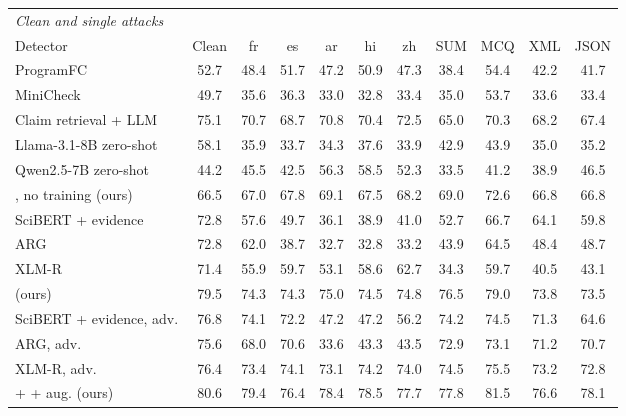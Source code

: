 \begin{table}[t]\centering\small\setlength{\tabcolsep}{4.5pt}
\begin{adjustbox}{max width=\textwidth}\begin{tabular}{lcccccccccc}
\toprule
\multicolumn{11}{l}{\emph{Clean and single attacks}} \\
Detector & Clean & fr & es & ar & hi & zh & SUM & MCQ & XML & JSON \\
\midrule
ProgramFC \citep{pan2023programfc} & 52.7 & 48.4 & 51.7 & 47.2 & 50.9 & 47.3 & 38.4 & 54.4 & 42.2 & 41.7 \\
MiniCheck \citep{tang2024minicheck} & 49.7 & 35.6 & 36.3 & 33.0 & 32.8 & 33.4 & 35.0 & 53.7 & 33.6 & 33.4 \\
Claim retrieval + LLM \citep{pikuliak2023multiclaim} & 75.1 & 70.7 & 68.7 & 70.8 & 70.4 & 72.5 & 65.0 & 70.3 & 68.2 & 67.4 \\
Llama-3.1-8B zero-shot \citep{grattafiori2024llama3} & 58.1 & 35.9 & 33.7 & 34.3 & 37.6 & 33.9 & 42.9 & 43.9 & 35.0 & 35.2 \\
Qwen2.5-7B zero-shot \citep{qwen2024qwen25} & 44.2 & 45.5 & 42.5 & 56.3 & 58.5 & 52.3 & 33.5 & 41.2 & 38.9 & 46.5 \\
\method{}, no training (ours) & 66.5 & 67.0 & 67.8 & 69.1 & 67.5 & 68.2 & 69.0 & 72.6 & 66.8 & 66.8 \\
SciBERT + evidence \citep{kotonya2020pubhealth} & 72.8 & 57.6 & 49.7 & 36.1 & 38.9 & 41.0 & 52.7 & 66.7 & 64.1 & 59.8 \\
ARG \citep{hu2024arg} & 72.8 & 62.0 & 38.7 & 32.7 & 32.8 & 33.2 & 43.9 & 64.5 & 48.4 & 48.7 \\
XLM-R \citep{conneau2020xlmr} & 71.4 & 55.9 & 59.7 & 53.1 & 58.6 & 62.7 & 34.3 & 59.7 & 40.5 & 43.1 \\
\method{} (ours) & 79.5 & 74.3 & 74.3 & 75.0 & 74.5 & 74.8 & 76.5 & 79.0 & 73.8 & 73.5 \\
\cmidrule(lr){1-11}
SciBERT + evidence, adv. \citep{kotonya2020pubhealth} & 76.8 & 74.1 & 72.2 & 47.2 & 47.2 & 56.2 & 74.2 & 74.5 & 71.3 & 64.6 \\
ARG, adv. \citep{hu2024arg} & 75.6 & 68.0 & 70.6 & 33.6 & 43.3 & 43.5 & 72.9 & 73.1 & 71.2 & 70.7 \\
XLM-R, adv. \citep{conneau2020xlmr} & 76.4 & 73.4 & 74.1 & 73.1 & 74.2 & 74.0 & 74.5 & 75.5 & 73.2 & 72.8 \\
\method{} + \air{} + aug. (ours) & 80.6 & 79.4 & 76.4 & 78.4 & 78.5 & 77.7 & 77.8 & 81.5 & 76.6 & 78.1 \\
\midrule

\end{tabular}
\end{adjustbox}
\end{table}
